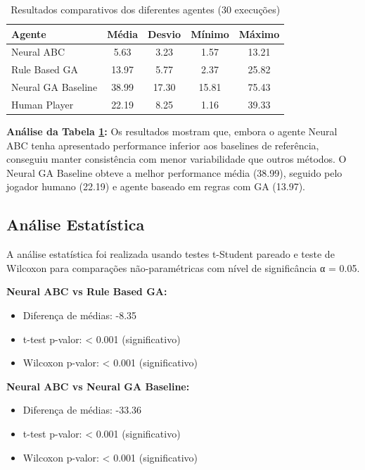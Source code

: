 \documentclass[review]{elsarticle}
\begin{document}
\begin{table}[htbp]
\centering
\caption{Resultados comparativos dos diferentes agentes (30 execuções)}
\label{tab:results}
\begin{tabular}{lcccc}
\toprule
\textbf{Agente} & \textbf{Média} & \textbf{Desvio} & \textbf{Mínimo} & \textbf{Máximo} \\
\midrule
Neural ABC & 5.63 & 3.23 & 1.57 & 13.21 \\
Rule Based GA & 13.97 & 5.77 & 2.37 & 25.82 \\
Neural GA Baseline & 38.99 & 17.30 & 15.81 & 75.43 \\
Human Player & 22.19 & 8.25 & 1.16 & 39.33 \\
\bottomrule
\end{tabular}
\end{table}

\textbf{Análise da Tabela \ref{tab:results}:} Os resultados mostram que, embora o agente Neural ABC tenha apresentado performance inferior aos baselines de referência, conseguiu manter consistência com menor variabilidade que outros métodos. O Neural GA Baseline obteve a melhor performance média (38.99), seguido pelo jogador humano (22.19) e agente baseado em regras com GA (13.97).

\subsection{Análise Estatística}

A análise estatística foi realizada usando testes t-Student pareado e teste de Wilcoxon para comparações não-paramétricas com nível de significância α = 0.05.

\textbf{Neural ABC vs Rule Based GA:}
\begin{itemize}
\item Diferença de médias: -8.35
\item t-test p-valor: < 0.001 (significativo)
\item Wilcoxon p-valor: < 0.001 (significativo)
\end{itemize}

\textbf{Neural ABC vs Neural GA Baseline:}
\begin{itemize}
\item Diferença de médias: -33.36
\item t-test p-valor: < 0.001 (significativo)
\item Wilcoxon p-valor: < 0.001 (significativo)
\end{itemize}
\end{document}
